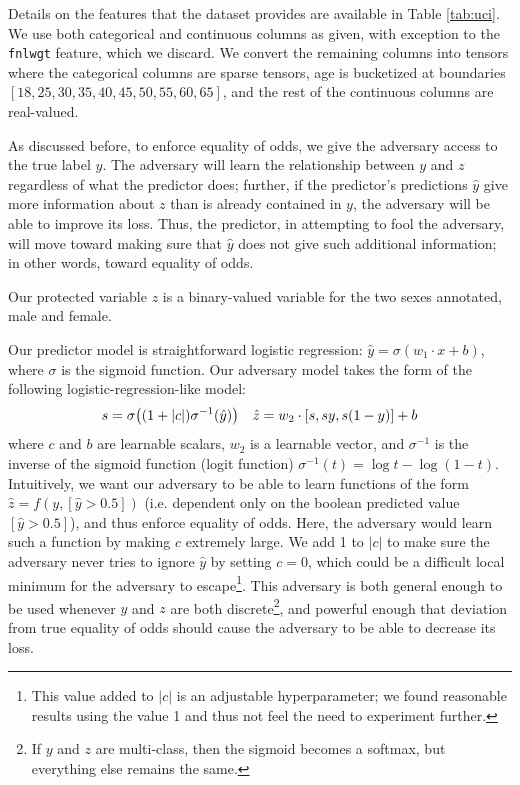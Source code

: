 \documentclass[letterpaper]{article} %
\theoremstyle{definition}
\begin{document}
Details on the features that the dataset provides are available in Table \ref{tab:uci}.  We use both categorical and continuous columns as given, with exception to the {\tt fnlwgt} feature, which we discard.  We convert the remaining columns into tensors where the categorical columns are sparse tensors, age is bucketized at boundaries $[18, 25, 30, 35, 40, 45, 50, 55, 60, 65]$, and the rest of the continuous columns are real-valued.


As discussed before, to enforce equality of odds, we give the adversary access to the true label $y$. The adversary will learn the relationship between $y$ and $z$ regardless of what the predictor does; further, if the predictor's predictions $\hat{y}$ give more information about $z$ than is already contained in $y$, the adversary will be able to improve its loss. Thus, the predictor, in attempting to fool the adversary, will move toward making sure that $\hat{y}$ does not give such additional information; in other words, toward equality of odds.

Our protected variable $z$ is a binary-valued variable for the two sexes annotated, {\sc male} and {\sc female}.

Our predictor model is straightforward logistic regression: $\hat{y}=\sigma(w_{1}\cdot x+b)$, where $\sigma$ is the sigmoid function.  Our adversary model takes the form of the following logistic-regression-like model:
\begin{alignat*}{2}
s=\sigma\qty((1+|c|)\sigma^{-1}(\hat{y}))\quad \hat{z}=w_{2}\cdot[s,sy,s(1-y)]+b
\end{alignat*}
where $c$ and $b$ are learnable scalars,  $w_{2}$ is a learnable vector, and $\sigma^{-1}$ is the inverse of the sigmoid function (logit function) $\sigma^{-1}(t)=\log t-\log (1-t)$. Intuitively, we want our adversary to be able to learn functions of the form $\hat{z}=f(y,[\hat{y}>0.5])$ (i.e. dependent only on the boolean predicted value $[\hat{y}>0.5]$), and thus enforce equality of odds. Here, the adversary would learn such a function by making $c$ extremely large. We add 1 to $|c|$ to make sure the adversary never tries to ignore $\hat{y}$ by setting $c=0$, which could be a difficult local minimum for the adversary to escape\footnote{This value added to $|c|$ is an adjustable hyperparameter; we found reasonable results using the value 1 and thus not feel the need to experiment further.}. This adversary is both general enough to be used whenever $y$ and $z$ are both discrete\footnote{If $y$ and $z$ are multi-class, then the sigmoid becomes a softmax, but everything else remains the same.}, and powerful enough that deviation from true equality of odds should cause the adversary to be able to decrease its loss.
\end{document}

